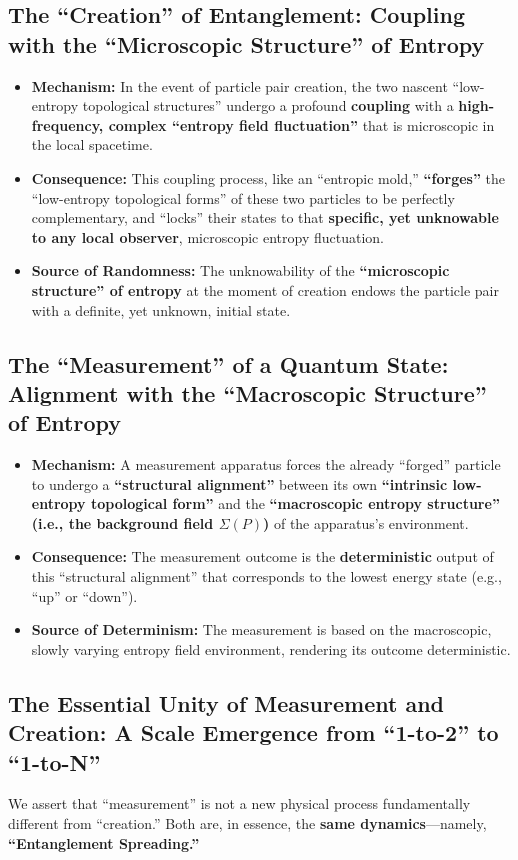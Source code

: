 \documentclass[11pt]{article}
\begin{document}
\subsection{The ``Creation'' of Entanglement: Coupling with the ``Microscopic Structure'' of Entropy}
\begin{itemize}
    \item   \textbf{Mechanism:} In the event of particle pair creation, the two nascent ``low-entropy topological structures'' undergo a profound \textbf{coupling} with a \textbf{high-frequency, complex ``entropy field fluctuation''} that is microscopic in the local spacetime.
    \item   \textbf{Consequence:} This coupling process, like an ``entropic mold,'' \textbf{``forges''} the ``low-entropy topological forms'' of these two particles to be perfectly complementary, and ``locks'' their states to that \textbf{specific, yet unknowable to any local observer}, microscopic entropy fluctuation.
    \item   \textbf{Source of Randomness:} The unknowability of the \textbf{``microscopic structure'' of entropy} at the moment of creation endows the particle pair with a definite, yet unknown, initial state.
\end{itemize}

\subsection{The ``Measurement'' of a Quantum State: Alignment with the ``Macroscopic Structure'' of Entropy}
\begin{itemize}
    \item   \textbf{Mechanism:} A measurement apparatus forces the already ``forged'' particle to undergo a \textbf{``structural alignment''} between its own \textbf{``intrinsic low-entropy topological form''} and the \textbf{``macroscopic entropy structure'' (i.e., the background field $\Sigma(P)$)} of the apparatus's environment.
    \item   \textbf{Consequence:} The measurement outcome is the \textbf{deterministic} output of this ``structural alignment'' that corresponds to the lowest energy state (e.g., ``up'' or ``down'').
    \item   \textbf{Source of Determinism:} The measurement is based on the macroscopic, slowly varying entropy field environment, rendering its outcome deterministic.
\end{itemize}

\subsection{The Essential Unity of Measurement and Creation: A Scale Emergence from ``1-to-2'' to ``1-to-N''}
We assert that ``measurement'' is not a new physical process fundamentally different from ``creation.'' Both are, in essence, the \textbf{same dynamics}—namely, \textbf{``Entanglement Spreading.''}
\end{document}
